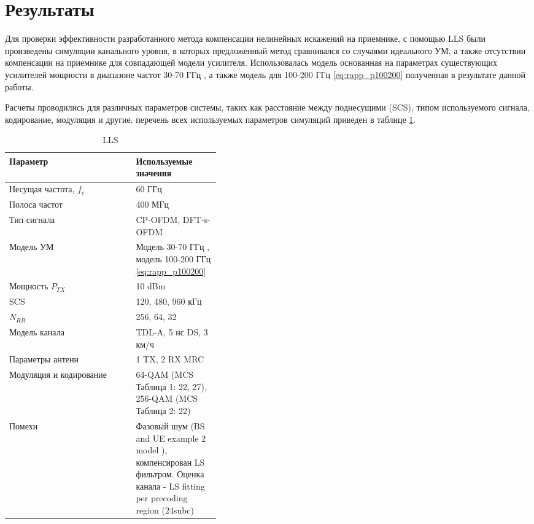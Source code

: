 \section{Результаты}
\label{sec:results}
Для проверки эффективности разработанного метода компенсации нелинейных
искажений на приемнике, с помощью LLS были произведены симуляции канального
уровня, в которых предложенный метод сравнивался со случаями идеального УМ,
а также отсутствии компенсации на приемнике для совпадающей модели
усилителя. Использовалась модель основанная на параметрах существующих
усилителей мощности в диапазоне частот 30-70 ГГц \cite{nokia163314}, а
также модель для 100-200 ГГц \ref{eq:rapp_p100200} полученная в результате
данной работы.

Расчеты проводились для различных параметров системы, таких как расстояние
между поднесущими (SCS), типом используемого сигнала, кодирование,
модуляция и другие. перечень всех используемых параметров симуляций
приведен в таблице \ref{tab:lls_parameters}.
\begin{table}[h!]
    \centering
    \bgroup
    \def\arraystretch{1.5}
    \begin{tabular}{l|p{0.4\linewidth}}
    Параметр & Используемые значения \\ \hline
    Несущая частота, $f_c$ & 60 ГГц   \\ \hline
    Полоса частот &  400 МГц  \\ \hline
    Тип сигнала &  CP-OFDM, DFT-s-OFDM  \\ \hline
    Модель УМ  &  Модель 30-70 ГГц \cite{nokia163314}, модель 100-200 ГГц \ref{eq:rapp_p100200}   \\ \hline
    Мощность $P_{TX}$ &  10 dBm  \\ \hline
    SCS &  120, 480, 960 кГц  \\ \hline
    $N_{RB}$ &  256, 64, 32  \\ \hline
    Модель канала &  TDL-A, 5 нс DS, 3 км/ч  \\ \hline
    Параметры антенн &  1 TX, 2 RX MRC  \\ \hline
    Модуляция и кодирование &  64-QAM (MCS Таблица 1: 22, 27), 256-QAM (MCS Таблица 2: 22)  \\ \hline
    Помехи &  Фазовый шум (BS and UE example 2 model \cite{3gpp.38.803}),
    компенсирован LS фильтром. Оценка канала - LS fitting per precoding
    region (24subc)
    \end{tabular}
    \egroup
    \caption{LLS}
    \label{tab:lls_parameters}
\end{table}

